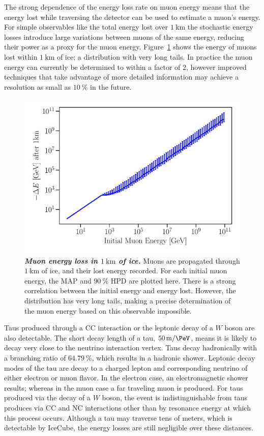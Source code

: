 The strong dependence of the energy loss rate on muon energy means that the energy lost while traversing the detector can be used to estimate a muon's energy.
For simple observables like the total energy lost over $\SI{1}\km$ the stochastic energy losses introduce large variations between muons of the same energy, reducing their power as a proxy for the muon energy.
Figure~\ref{fig:muon_energy} shows the energy of muons lost within $\SI{1}\km$ of ice; a distribution with very long tails.
In practice the muon energy can currently be determined to within a factor of $2$, however improved techniques that take advantage of more detailed information may achieve a resolution as small as $\SI{10}\percent$ in the future.

\begin{figure}
	\centering
	\includegraphics[width=\linewidth]{figures/muon_energy}
	\internallinenumbers
	\caption{\textbf{\textit{Muon energy loss in $\SI{1}\km$ of ice.}}
	Muons are propagated through $\SI{1}\km$ of ice, and their lost energy recorded.
	For each initial muon energy, the MAP and $\SI{90}\percent$ HPD are plotted here.
	There is a strong correlation between the initial energy and energy lost.
	However, the distribution has very long tails, making a precise determination of the muon energy based on this observable impossible.
	}\label{fig:muon_energy}
\end{figure}

Taus produced through a CC interaction or the leptonic decay of a $W$ boson are also detectable.
The short decay length of a tau, $\SI{50}\meter / \si\PeV$, means it is likely to decay very close to the neutrino interaction vertex.
Taus decay hadronically with a branching ratio of $\SI{64.79}\percent$, which results in a hadronic shower.
Leptonic decay modes of the tau are decay to a charged lepton and corresponding neutrino of either electron or muon flavor.
In the electron case, an electromagnetic shower results; whereas in the muon case a far traveling muon is produced.
For taus produced via the decay of a $W$ boson, the event is indistinguishable from taus produces via CC and NC interactions other than by resonance energy at which this process occurs.
Although a tau may traverse tens of meters, which is detectable by IceCube, the energy losses are still negligible over these distances.

